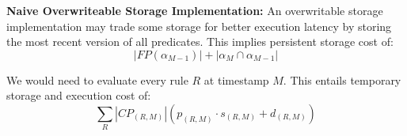 {\bf Naive Overwriteable Storage Implementation: }An overwritable storage
implementation may trade some storage for better execution latency by storing
the most recent version of all predicates.  This implies persistent storage
cost of:
%
\[ |FP(\alpha_{M-1})| + |\alpha_M \cap \alpha_{M-1}| \]

We would need to evaluate every rule $R$ at timestamp $M$.  This entails
temporary storage and execution cost of:
%
\[ \sum_{R} |CP_{(R,M)}|(p_{(R,M)} \cdot s_{(R,M)} + d_{(R,M)}) \]






